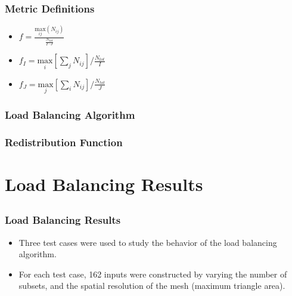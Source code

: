 \documentclass[]{beamer}
\begin{document}
\begin{frame}[t]\frametitle{Metric Definitions}
	\begin{block}{}
		\begin{itemize}
			\item $f =\frac{\underset{ij}{\text{max}}(N_{ij})}{\frac{N_{tot}}{I\cdot J}}$
			\item $f_I = \underset{i}{\text{max}}[\sum_{j} N_{ij}]/\frac{N_{tot}}{I}$
			\item $f_J = \underset{j}{\text{max}}[\sum_{i} N_{ij}]/\frac{N_{tot}}{J}$
		\end{itemize}
	\end{block}
\end{frame}

\begin{frame}[t]\frametitle{Load Balancing Algorithm}
\vspace{-0.5 cm}
\begin{block}{}

\end{block}
\end{frame}

\begin{frame}[t]\frametitle{Redistribution Function}
\vspace{-0.5 cm}
\begin{block}{}

\end{block}
\end{frame}

\section{Load Balancing Results}
\subsection{}
\begin{frame}[t]\frametitle{Load Balancing Results}
\begin{block}{}
\begin{itemize}
	\item Three test cases were used to study the behavior of the load balancing algorithm.
	\item For each test case, 162 inputs were constructed by varying the number of subsets, and the spatial resolution of the mesh (maximum triangle area).
\end{itemize}
\end{block}
\end{frame}
\end{document}
